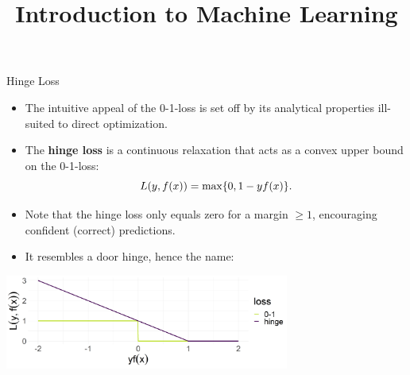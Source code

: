 





\newcommand{\titlefigure}{figure_man/optimization_steps.jpeg}
\newcommand{\learninggoals}{
  \item Know the exponential loss
  \item Know the AUC loss 
}

\title{Introduction to Machine Learning}
\date{}





\begin{vbframe}{Hinge Loss}

\begin{itemize}
  \item The intuitive appeal of the 0-1-loss is set off by its analytical
  properties ill-suited to direct optimization.
  \item The \textbf{hinge loss} is a continuous relaxation that acts as a convex 
  upper bound on the 0-1-loss: 
  $$L(y, f(x)) = \max \{ 0, 1 - yf(x) \}.$$
  \item Note that the hinge loss only equals zero for a margin $\geq 1$, 
  encouraging confident (correct) predictions.
  \item It resembles a door hinge, hence the name:
\end{itemize}

\begin{center}
\includegraphics[width = 0.7\textwidth]{figure/plot_loss_hinge.png}
\end{center}

\end{vbframe}



